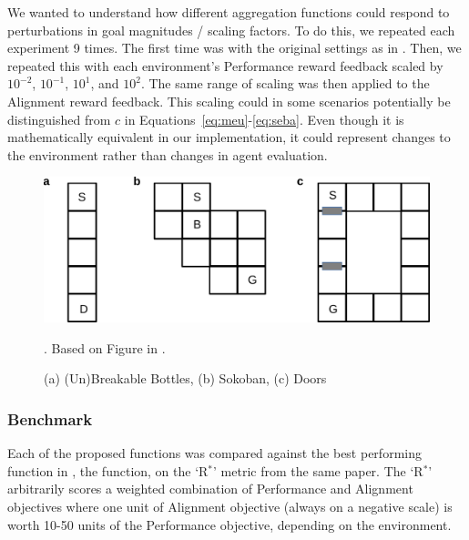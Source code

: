 We wanted to understand how different aggregation functions could respond to perturbations in goal magnitudes / scaling factors. To do this, we repeated each experiment 9 times. The first time was with the original settings as in \cite{vamplew_potential-based_2021}. Then, we repeated this with each environment's Performance reward feedback scaled by $10^{-2}$, $10^{-1}$, $10^1$, and $10^2$. The same range of scaling was then applied to the Alignment reward feedback. This scaling could in some scenarios potentially be distinguished from $c$ in Equations~\ref{eq:meu}-\ref{eq:seba}. Even though it is mathematically equivalent in our implementation, it could represent changes to the environment rather than changes in agent evaluation.


\begin{figure}
    \centering
    \includegraphics[width=1\columnwidth]{output/env_figure.pdf}
    \caption{(a) (Un)Breakable Bottles, (b) Sokoban, (c) Doors}. Based on Figure in \cite{vamplew_potential-based_2021}.
    \label{fig:envs}
\end{figure}

\subsubsection{Benchmark}

Each of the proposed functions was compared against the best performing function in \cite{vamplew_potential-based_2021}, the \tloA{} function, on the `R$^*$' metric from the same paper. The `R$^*$' arbitrarily scores a weighted combination of Performance and Alignment objectives where one unit of Alignment objective (always on a negative scale) is worth 10-50 units of the Performance objective, depending on the environment.%


